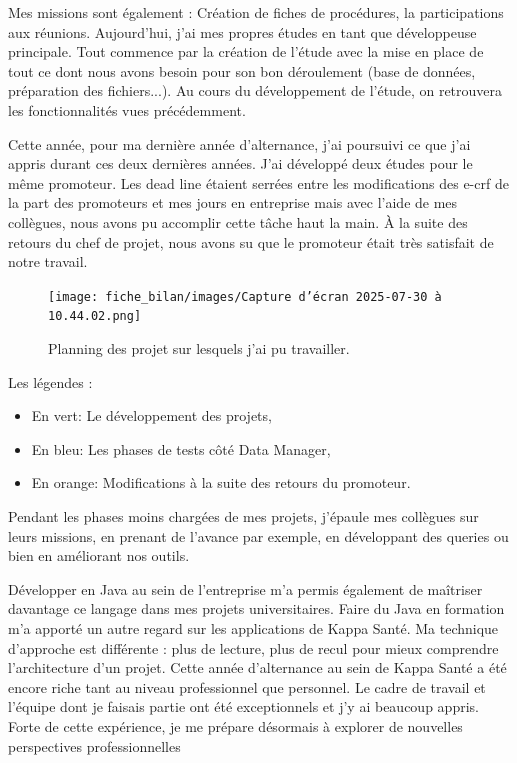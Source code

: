 Mes missions sont également : Création de fiches de procédures, la participations aux réunions. 
Aujourd’hui, j’ai mes propres études en tant que développeuse principale. Tout commence par la création de l’étude avec la mise en place de tout ce dont nous avons besoin pour son bon déroulement (base de données, préparation des fichiers...). Au cours du développement de l’étude, on retrouvera les fonctionnalités vues précédemment.
\vspace{0.5cm}

Cette année, pour ma dernière année d'alternance, j'ai poursuivi ce que j'ai appris durant ces deux dernières années. J'ai développé deux études pour le même promoteur. Les dead line étaient serrées entre les modifications des e-crf de la part des promoteurs et mes jours en entreprise mais avec l'aide de mes collègues, nous avons pu accomplir cette tâche haut la main. À la suite des retours du chef de projet, nous avons su que le promoteur était très satisfait de notre travail. 
\begin{figure}[H]
    \centering
    \texttt{[image: fiche\_bilan/images/Capture d’écran 2025-07-30 à 10.44.02.png]} 
    \caption{Planning des projet sur lesquels j'ai pu travailler.}
\end{figure}
Les légendes :
\begin{itemize}
    \item En vert: Le développement des projets,
    \item En bleu: Les phases de tests côté Data Manager,
    \item En orange: Modifications à la suite des retours du promoteur.
\end{itemize}

Pendant les phases moins chargées de mes projets, j'épaule mes collègues sur leurs missions, en prenant de l'avance par exemple, en développant des queries ou bien en améliorant nos outils.

\vspace{0.5cm}
Développer en Java au sein de l’entreprise m’a permis également de maîtriser davantage ce langage dans mes projets universitaires. Faire du Java en formation m’a apporté un autre regard sur les applications de Kappa Santé. Ma technique d’approche est différente : plus de lecture, plus de recul pour mieux comprendre l’architecture d’un projet. 
Cette année d’alternance au sein de Kappa Santé a été encore riche tant au niveau professionnel que personnel.
Le cadre de travail et l’équipe dont je faisais partie ont été exceptionnels et j’y ai beaucoup appris. 
Forte de cette expérience, je me prépare désormais à explorer de nouvelles perspectives professionnelles
